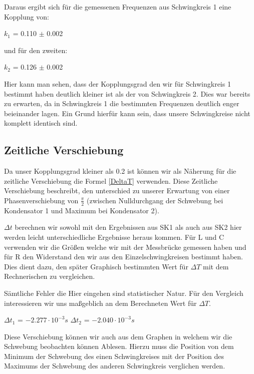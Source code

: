 \documentclass[twoside]{protokoll}
\begin{document}
Daraus ergibt sich für die gemessenen Frequenzen aus Schwingkreis 1 eine Kopplung von:
\begin{center}
$k_1$ = 0.110 $\pm$ 0.002
\end{center}
und für den zweiten:
\begin{center}
$k_2$ = 0.126 $\pm$ 0.002
\end{center}

Hier kann man sehen, dass der Kopplungsgrad den wir für Schwingkreis 1 bestimmt haben deutlich kleiner ist als der von Schwingkreis 2. 
Dies war bereits zu erwarten, da in Schwingkreis 1 die bestimmten Frequenzen deutlich enger beieinander lagen. 
Ein Grund hierfür kann sein, dass unsere Schwingkreise nicht komplett identisch sind. 

\subsection{Zeitliche Verschiebung}

Da unser Kopplungsgrad kleiner als 0.2 ist können wir als Näherung für die zeitliche Verschiebung die Formel \ref{DeltaT} verwenden. 
Diese Zeitliche Verschiebung beschreibt, den unterschied zu unserer Erwartung von einer Phasenverschiebung von $\frac{\pi}{2}$ (zwischen Nulldurchgang der Schwebung bei Kondensator 1 und Maximum bei Kondensator 2).

$\Delta t$ berechnen wir sowohl mit den Ergebnissen aus SK1 als auch aus SK2 hier werden leicht unterschiedliche Ergebnisse heraus kommen. 
Für L und C verwenden wir die Größen welche wir mit der Messbrücke gemessen haben und für R den Widerstand den wir aus den Einzelschwingkreisen bestimmt haben. \\
Dies dient dazu, den später Graphisch bestimmten Wert für $\Delta T$ mit dem Rechnerischen zu vergleichen.

Sämtliche Fehler die Hier eingehen sind statistischer Natur. Für den Vergleich interessieren wir uns maßgeblich an dem Berechneten Wert für $\Delta T$.
\begin{center}
$\Delta t_1$ = $-2.277 \cdot 10^{-3}s  $ \qquad
$\Delta t_2$ = $-2.040 \cdot 10^{-3}s  $
\end{center}

Diese Verschiebung können wir auch aus dem Graphen in welchem wir die Schwebung beobachten können Ablesen. 
Hierzu muss die Position von dem Minimum der Schwebung des einen Schwingkreises mit der Position des Maximums der Schwebung des anderen Schwingkreis verglichen werden.  
\end{document}
